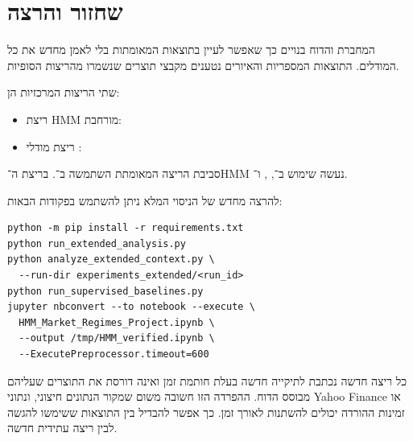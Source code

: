 \appendix
\section{שחזור והרצה}

המחברת והדוח בנויים כך שאפשר לעיין בתוצאות המאומתות בלי לאמן מחדש את כל המודלים. התוצאות המספריות והאיורים נטענים מקבצי תוצרים שנשמרו מהריצות הסופיות.

שתי הריצות המרכזיות הן:

\begin{itemize}
    \item ריצת HMM מורחבת: 
    \item ריצת מודלי : 
\end{itemize}

סביבת הריצה המאומתת השתמשה ב־. בריצת ה־HMM נעשה שימוש ב־, ,  ו־.

להרצה מחדש של הניסוי המלא ניתן להשתמש בפקודות הבאות:

\begin{english}
\begin{verbatim}
python -m pip install -r requirements.txt
python run_extended_analysis.py
python analyze_extended_context.py \
  --run-dir experiments_extended/<run_id>
python run_supervised_baselines.py
jupyter nbconvert --to notebook --execute \
  HMM_Market_Regimes_Project.ipynb \
  --output /tmp/HMM_verified.ipynb \
  --ExecutePreprocessor.timeout=600
\end{verbatim}
\end{english}

כל ריצה חדשה נכתבת לתיקייה חדשה בעלת חותמת זמן ואינה דורסת את התוצרים שעליהם מבוסס הדוח. ההפרדה הזו חשובה משום שמקור הנתונים חיצוני, ונתוני Yahoo Finance או זמינות ההורדה יכולים להשתנות לאורך זמן. כך אפשר להבדיל בין התוצאות ששימשו להגשה לבין ריצה עתידית חדשה.

